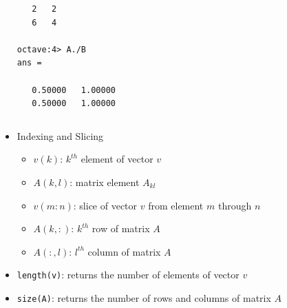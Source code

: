 \documentclass[slidestop,mathserif,compress,xcolor=svgnames]{beamer}
\begin{document}
\begin{frame}
\begin{itemize}
{\begin{columns}
\begin{verbatim}
   2   2
   6   4

octave:4> A./B
ans =

   0.50000   1.00000
   0.50000   1.00000
        \end{verbatim}
      \end{columns}
    }
    \framebreak
    \item Indexing and Slicing
    \begin{itemize}
      \item $v(k)$: $k^{th}$ element of vector $v$
      \item $A(k,l)$: matrix element $A_{kl}$
      \item $v(m:n)$: slice of vector $v$ from element $m$ through $n$
      \item $A(k,:)$: $k^{th}$ row of matrix $A$
      \item $A(:,l)$: $l^{th}$ column of matrix $A$
    \end{itemize}
    \item \texttt{length(v)}: returns the number of elements of vector $v$
    \item \texttt{size(A)}: returns the number of rows and columns of matrix $A$
  \end{itemize}
\end{frame}
\end{document}
